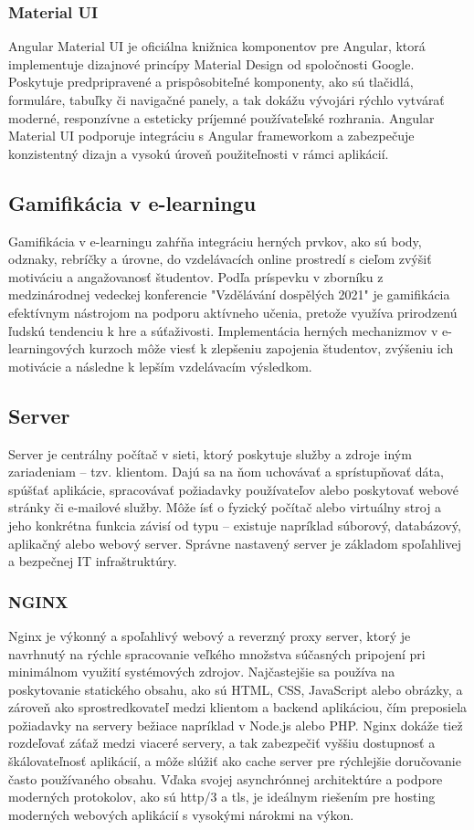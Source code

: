  \subsubsection{Material UI}
 Angular Material UI je oficiálna knižnica komponentov pre Angular, ktorá implementuje dizajnové princípy Material Design od spoločnosti Google. 
 Poskytuje predpripravené a prispôsobiteľné komponenty, ako sú tlačidlá, formuláre, tabuľky či navigačné panely, a tak dokážu vývojári rýchlo vytvárať moderné, responzívne a esteticky príjemné používateľské rozhrania.
  Angular Material UI podporuje integráciu s Angular frameworkom a zabezpečuje konzistentný dizajn a vysokú úroveň použiteľnosti v rámci aplikácií. \cite{materialUI}

\subsection{Gamifikácia v e-learningu}
Gamifikácia v e-learningu zahŕňa integráciu herných prvkov, ako sú body, odznaky, rebríčky a úrovne, do vzdelávacích online prostredí s cieľom zvýšiť motiváciu a angažovanosť študentov.
 Podľa príspevku v zborníku z medzinárodnej vedeckej konferencie "Vzdělávání dospělých 2021" \cite{gamifikacia} je gamifikácia efektívnym nástrojom na podporu aktívneho učenia, pretože využíva prirodzenú ľudskú tendenciu k hre a súťaživosti.
  Implementácia herných mechanizmov v e-learningových kurzoch môže viesť k zlepšeniu zapojenia študentov, zvýšeniu ich motivácie a následne k lepším vzdelávacím výsledkom.

\subsection{Server}
Server je centrálny počítač v sieti, ktorý poskytuje služby a zdroje iným zariadeniam – tzv. klientom. 
Dajú sa na ňom uchovávať a sprístupňovať dáta, spúšťať aplikácie, spracovávať požiadavky používateľov alebo poskytovať webové stránky či e-mailové služby.
 Môže ísť o fyzický počítač alebo virtuálny stroj a jeho konkrétna funkcia závisí od typu – existuje napríklad súborový, databázový, aplikačný alebo webový server. 
 Správne nastavený server je základom spoľahlivej a bezpečnej IT infraštruktúry.\cite{server}
\subsubsection{NGINX}
Nginx je výkonný a spoľahlivý webový a reverzný proxy server, ktorý je navrhnutý na rýchle spracovanie veľkého množstva súčasných pripojení pri minimálnom využití systémových zdrojov. 
Najčastejšie sa používa na poskytovanie statického obsahu, ako sú HTML, CSS, JavaScript alebo obrázky, a zároveň ako sprostredkovateľ medzi klientom a backend aplikáciou, čím preposiela požiadavky na servery bežiace napríklad v Node.js alebo PHP. 
Nginx dokáže tiež rozdeľovať záťaž medzi viaceré servery, a tak zabezpečiť vyššiu dostupnosť a škálovateľnosť aplikácií, a môže slúžiť ako cache server pre rýchlejšie doručovanie často používaného obsahu.
 Vďaka svojej asynchrónnej architektúre a podpore moderných protokolov, ako sú \acrshort{http}/3 a \acrshort{tls}, je ideálnym riešením pre hosting moderných webových aplikácií s vysokými nárokmi na výkon.\cite{nginx}

